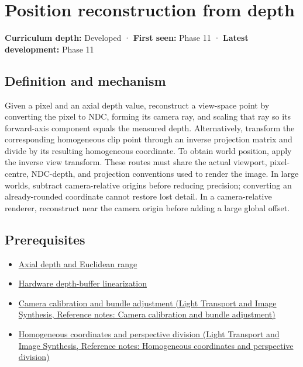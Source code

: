 \hypertarget{appendix-2cbf2968e866}{}\label{referencestart:appendix-2cbf2968e866}
\section{Position reconstruction from depth}\label{appendix-2cbf2968e866-position-reconstruction-from-depth}

\textbf{Curriculum depth:} Developed · \textbf{First seen:} Phase 11 · \textbf{Latest development:} Phase 11

\begin{allmightroledefinition}

\subsection{Definition and mechanism}\label{appendix-2cbf2968e866-definition-and-mechanism}

Given a pixel and an axial depth value, reconstruct a view-space point by converting the pixel to NDC, forming its camera ray, and scaling that ray so its forward-axis component equals the measured depth. Alternatively, transform the corresponding homogeneous clip point through an inverse projection matrix and divide by its resulting homogeneous coordinate. To obtain world position, apply the inverse view transform. These routes must share the actual viewport, pixel-centre, NDC-depth, and projection conventions used to render the image. In large worlds, subtract camera-relative origins before reducing precision; converting an already-rounded coordinate cannot restore lost detail. In a camera-relative renderer, reconstruct near the camera origin before adding a large global offset.

\end{allmightroledefinition}

\subsection{Prerequisites}\label{appendix-2cbf2968e866-prerequisites}

\begin{itemize}
\tightlist
\item
  \hyperref[appendix-cac01ebeeb11]{Axial depth and Euclidean range}
\item
  \hyperref[appendix-1bc40b08db4a]{Hardware depth-buffer linearization}
\item
  \href{../04-Light-Transport-and-Image-Synthesis/main.pdf\#nameddest=appendix-3ee9861904d5}{Camera calibration and bundle adjustment (Light Transport and Image Synthesis, Reference notes: Camera calibration and bundle adjustment)}
\item
  \href{../04-Light-Transport-and-Image-Synthesis/main.pdf\#nameddest=appendix-cb3b26862282}{Homogeneous coordinates and perspective division (Light Transport and Image Synthesis, Reference notes: Homogeneous coordinates and perspective division)}
\end{itemize}

